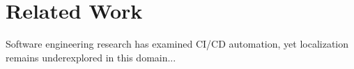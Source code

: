  \section{Related Work}
Software engineering research has examined CI/CD automation, yet localization remains underexplored in this domain...
